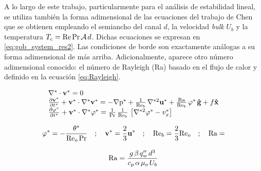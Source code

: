 A lo largo de este trabajo, particularmente para el análisis de estabilidad lineal, se utiliza también la forma adimensional de las ecuaciones del trabajo de Chen \cite{chen1996linear} que se obtienen empleando el  semiancho del canal $d$, la velocidad \textit{bulk} $U_b$ y la temperatura $T_c = \text{Re} \hspace{0.5mm} \text{Pr} \hspace{0.5mm} \mathcal{A} \hspace{0.5mm} d$. Dichas ecuaciones se expresan en \ref{eq:gob_system_res2}. Las condiciones de borde son exactamente análogas a su forma adimensional de más arriba. Adicionalmente, aparece otro número adimensional conocido: el número de Rayleigh (Ra) basado en el flujo de calor y definido en la ecuación \ref{eq:Rayleigh}.

\begin{equation}
\begin{array}{l}
    \nabla^* \cdot \mathbf{v^*} = 0 \\
    \frac{\partial \mathbf{v^*}}{\partial t^*} + \mathbf{v^*} \cdot \nabla^* \mathbf{v^*} = 
    -\nabla \text{p}^* + \frac{1}{\text{Re}_b} \hspace{0.5mm} \nabla^{*2} \mathbf{u^*} + \frac{\text{Ra}}{\text{Re}_b} \hspace{0.5mm} \varphi^* \hspace{0.5mm} \mathbf{\hat{g}} + f \mathbf{\hat{x}} \\
    \frac{\partial \varphi^*}{\partial t^*} + \mathbf{v^*} \cdot \nabla^* \varphi^* = 
    \frac{1}{\text{Pr}}\hspace{0.5mm}  \frac{1}{\text{Re}_b} \hspace{0.5mm} \left[ \nabla^{*2} \varphi^* - v_x^* \right]  
\end{array}
\label{eq:gob_system_res2}
\end{equation}

\begin{equation*}
\varphi^* = -  \frac{\theta^*}{\text{Re}_o \hspace{0.5mm} \text{Pr}}  \quad ; \quad \mathbf{v^*} = \frac{2}{3} \mathbf{u^*} \quad ; \quad \text{Re}_b = \frac{2}{3} \text{Re}_o \quad ; \quad \text{Ra} = 
\end{equation*}  

\begin{equation}
\text{Ra} = \frac{g \hspace{0.5mm} \beta \hspace{0.5mm} q''_w \hspace{0.5mm} d^3}{c_p \hspace{0.5mm} \alpha \hspace{0.5mm} \mu_o \hspace{0.5mm} U_b}
\label{eq:Rayleigh}
\end{equation} 

